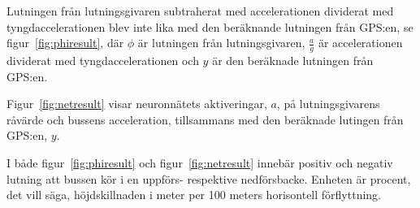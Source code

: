 Lutningen från lutningsgivaren subtraherat med accelerationen dividerat med tyngdaccelerationen
blev inte lika med den beräknande lutningen från GPS:en, se figur~\ref{fig:phiresult},
där $\phi$ är lutningen från lutningsgivaren,
$\frac{a}{g}$ är accelerationen dividerat med tyngdaccelerationen
och $y$ är den beräknade lutningen från GPS:en.

Figur~\ref{fig:netresult} visar neuronnätets aktiveringar, $a$, på
lutningsgivarens råvärde och bussens acceleration,
tillsammans med den beräknade lutingen från GPS:en, $y$.

I både figur~\ref{fig:phiresult} och figur~\ref{fig:netresult} innebär
positiv och negativ lutning att bussen kör i en uppförs- respektive nedförsbacke.
Enheten är procent, det vill säga,
höjdskillnaden i meter per 100 meters horisontell förflyttning.
